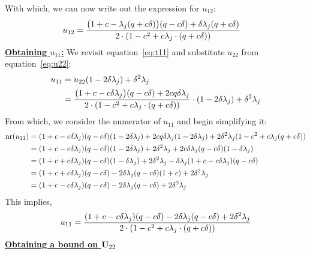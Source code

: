 With which, we can now write out the expression for $u_{12}$:
\begin{align}
\label{eq:u12}
u_{12}&=\frac{\big(1+c-\lambda_j(q +c\delta)\big)(q -c\delta)+\delta\lambda_j(q +c\delta)}{2\cdot(1-c^2+c\lambda_j\cdot(q +c\delta))}
\end{align}
\underline{\bf Obtaining $u_{11}$:}
We revisit equation~\ref{eq:t11} and substitute $u_{22}$ from equation~\ref{eq:u22}:
\begin{align*}
u_{11}&=u_{22}(1-2\delta\lambda_j)+\delta^2\lambda_j\\
&=\frac{\big(1+c-c\delta\lambda_j\big)(q -c\delta)+2cq \delta\lambda_j}{2\cdot(1-c^2+c\lambda_j\cdot(q +c\delta))}\cdot(1-2\delta\lambda_j)+\delta^2\lambda_j
\end{align*}
From which, we consider the numerator of $u_{11}$ and begin simplifying it:
\begin{align}
\label{eq:nr-u11}
\text{nr}(u_{11})&=(1+c-c\delta\lambda_j)(q -c\delta)(1-2\delta\lambda_j)+2cq \delta\lambda_j(1-2\delta\lambda_j)+2\delta^2\lambda_j(1-c^2+c\lambda_j(q +c\delta))\nonumber\\
&=(1+c-c\delta\lambda_j)(q -c\delta)(1-2\delta\lambda_j)+2\delta^2\lambda_j + 2c\delta\lambda_j(q -c\delta)(1-\delta\lambda_j)\nonumber\\
&=(1+c+c\delta\lambda_j)(q -c\delta)(1-\delta\lambda_j)+2\delta^2\lambda_j-\delta\lambda_j(1+c-c\delta\lambda_j)(q -c\delta)\nonumber\\
&=(1+c+c\delta\lambda_j)(q -c\delta)-2\delta\lambda_j(q -c\delta)(1+c)+2\delta^2\lambda_j\nonumber\\
&=(1+c-c\delta\lambda_j)(q -c\delta)-2\delta\lambda_j(q -c\delta)+2\delta^2\lambda_j
\end{align}
This implies,
\begin{align}
\label{eq:u11}
u_{11} = \frac{(1+c-c\delta\lambda_j)(q -c\delta)-2\delta\lambda_j(q -c\delta)+2\delta^2\lambda_j}{2\cdot(1-c^2+c\lambda_j\cdot(q +c\delta))}
\end{align}
\underline{\bf Obtaining a bound on $\mathbf{U}_{22}$}

